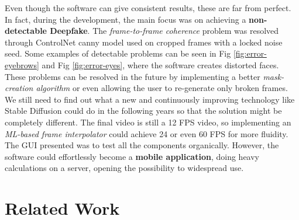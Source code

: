 \documentclass[preprint]{elsarticle}
\begin{document}
Even though the software can give consistent results, these are far from perfect. 
In fact, during the development, the main focus was on achieving a \textbf{non-detectable Deepfake}. 
The \emph{frame-to-frame coherence} problem was resolved through ControlNet 
canny model used on cropped frames with a locked noise seed. 
Some examples of detectable problems can be seen in Fig \ref{fig:error-eyebrows} and Fig \ref{fig:error-eyes}, 
where the software creates distorted faces. 
These problems can be resolved in the future by implementing a better 
\emph{mask-creation algorithm} or even allowing the user to re-generate only broken frames.
We still need to find out what a new and continuously improving technology like 
Stable Diffusion could do in the following years so that the solution might be completely different. 
The final video is still a 12 FPS video, so implementing an \emph{ML-based frame interpolator} could achieve 
24 or even 60 FPS for more fluidity. 
The GUI presented was to test all the components organically. 
However, the software could effortlessly become a \textbf{mobile application}, 
doing heavy calculations on a server, opening the possibility to widespread use.


\section{Related Work}\label{sect:related}
\end{document}
